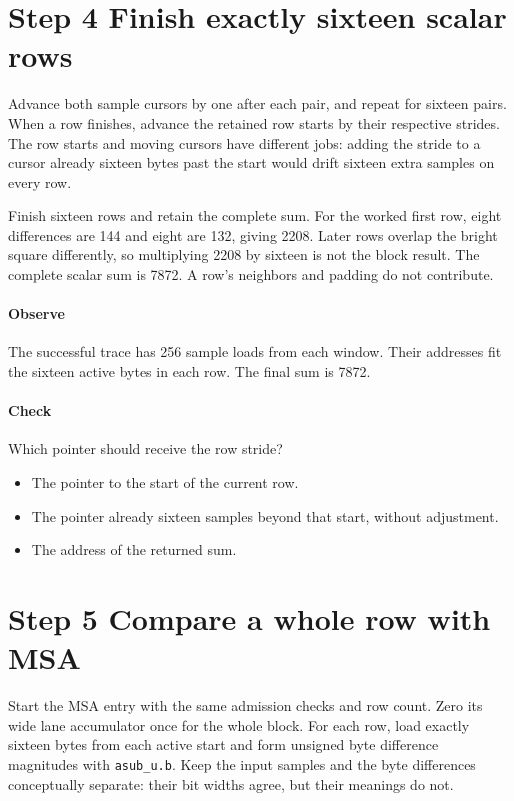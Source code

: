 \section{Step 4 Finish exactly sixteen scalar rows}\label{h263-sad-s04}
Advance both sample cursors by one after each pair, and repeat for sixteen pairs.
When a row finishes, advance the retained row starts by their respective strides.
The row starts and moving cursors have different jobs: adding the stride to a
cursor already sixteen bytes past the start would drift sixteen extra samples
on every row.

Finish sixteen rows and retain the complete sum. For the worked first row, eight
differences are 144 and eight are 132, giving 2208. Later rows overlap the bright
square differently, so multiplying 2208 by sixteen is not the block result.
The complete scalar sum is 7872. A row's neighbors and padding do not contribute.

\paragraph{Observe} The successful trace has 256 sample loads from each window.
Their addresses fit the sixteen active bytes in each row. The final sum is 7872.
\paragraph{Check} Which pointer should receive the row stride?
\begin{itemize}
  \item[A.] The pointer to the start of the current row.
  \item[B.] The pointer already sixteen samples beyond that start, without adjustment.
  \item[C.] The address of the returned sum.
\end{itemize}

\section{Step 5 Compare a whole row with MSA}\label{h263-sad-s05}
Start the MSA entry with the same admission checks and row count. Zero its wide
lane accumulator once for the whole block. For each row, load exactly sixteen
bytes from each active start and form unsigned byte difference magnitudes with
\texttt{asub\_u.b}. Keep the input samples and the byte differences conceptually
separate: their bit widths agree, but their meanings do not.

